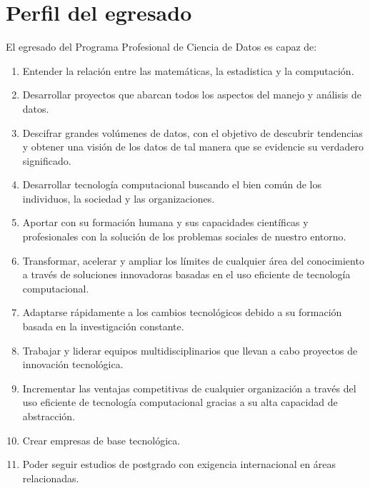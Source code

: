 \section{Perfil del egresado}

El egresado del Programa Profesional de Ciencia de Datos es capaz de:
\begin{enumerate}
\item Entender la relación entre las matemáticas, la estadistica y la computación.
\item Desarrollar proyectos que abarcan todos los aspectos del manejo y análisis de datos.
\item Descifrar grandes volúmenes de datos, con el objetivo de descubrir tendencias y obtener una visión de los datos de tal manera que se evidencie su verdadero significado.
\item Desarrollar tecnología computacional buscando el bien común de los individuos, la sociedad y las organizaciones.

\item Aportar con su formación humana y sus capacidades científicas y profesionales con la solución de los problemas sociales de nuestro entorno.
\item Transformar, acelerar y ampliar los límites de cualquier área del conocimiento a través de soluciones innovadoras basadas en el uso eficiente de tecnología computacional.
\item Adaptarse rápidamente a los cambios tecnológicos debido a su formación basada en la investigación constante.
\item Trabajar y liderar equipos multidisciplinarios que llevan a cabo proyectos de innovación tecnológica.
\item Incrementar las ventajas competitivas de cualquier organización a través del uso eficiente de tecnología computacional gracias a su alta capacidad de abstracción.
\item Crear empresas de base tecnológica.
\item Poder seguir estudios de postgrado con exigencia internacional en áreas relacionadas.
\end{enumerate}
